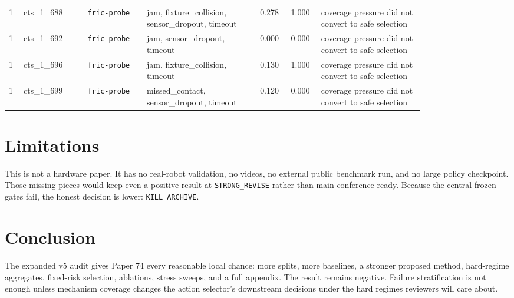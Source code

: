 \documentclass{article}
\begin{document}
\begin{center}
\begin{tabular}{p{0.035\linewidth}p{0.13\linewidth}p{0.12\linewidth}p{0.23\linewidth}p{0.055\linewidth}p{0.045\linewidth}p{0.21\linewidth}}
1 & cts\_1\_688 & \texttt{fric-probe} & jam, fixture\_collision, sensor\_dropout, timeout & 0.278 & 1.000 & coverage pressure did not convert to safe selection \\
1 & cts\_1\_692 & \texttt{fric-probe} & jam, sensor\_dropout, timeout & 0.000 & 0.000 & coverage pressure did not convert to safe selection \\
1 & cts\_1\_696 & \texttt{fric-probe} & jam, fixture\_collision, timeout & 0.130 & 1.000 & coverage pressure did not convert to safe selection \\
1 & cts\_1\_699 & \texttt{fric-probe} & missed\_contact, sensor\_dropout, timeout & 0.120 & 0.000 & coverage pressure did not convert to safe selection \\
\bottomrule
\end{tabular}
\end{center}
\normalsize

\section{Limitations}
This is not a hardware paper. It has no real-robot validation, no videos, no external public benchmark run, and no large policy checkpoint. Those missing pieces would keep even a positive result at \texttt{STRONG\_REVISE} rather than main-conference ready. Because the central frozen gates fail, the honest decision is lower: \texttt{KILL\_ARCHIVE}.

\section{Conclusion}
The expanded v5 audit gives Paper 74 every reasonable local chance: more splits, more baselines, a stronger proposed method, hard-regime aggregates, fixed-risk selection, ablations, stress sweeps, and a full appendix. The result remains negative. Failure stratification is not enough unless mechanism coverage changes the action selector's downstream decisions under the hard regimes reviewers will care about.

\appendix
\end{document}
